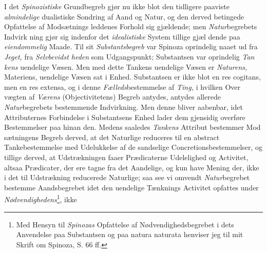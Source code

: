 I det \emph{Spinozistiske} Grundbegreb gjør nu ikke blot den
tidligere paaviste \emph{almindelige} dualistiske Sondring af Aand
og Natur, og den derved betingede Opfattelse af Modsætnings\-%
leddenes Forhold sig gjældende; men \emph{Natur}begrebets Indvirk\-%
ning gjør sig indenfor det \emph{idealistiske} System tillige gjæl\-%
dende paa \emph{eiendommelig} Maade. Til sit \emph{Substantsbegreb}
var Spinoza oprindelig naaet ud fra \emph{Jeget,} fra \emph{Selvbevidst\-%
heden} som Udgangspunkt; Substantsen var oprindelig \emph{Tan\-%
kens} uendelige Væsen. Men med dette Tankens uendelige
Væsen er \emph{Naturens,} Materiens, uendelige Væsen sat i Enhed.
Substantsen er ikke blot en res cogitans, men en res extensa,
og i denne \emph{Fælleds}bestemmelse af \emph{Ting,} i hvilken Over\-%
\setcounter{footnote}{0}%
vægten af \emph{Værens} (Objectivitetens) Begreb antydes, antydes
allerede \emph{Natur}begrebets bestemmende Indvirkning. Men denne
bliver aabenbar, idet Attributernes Forbindelse i Substantsens
Enhed lader dem gjensidig overføre Bestemmelser paa hinan\-%
den. Medens saaledes \emph{Tankens} Attribut bestemmer Mod\-%
sætningens Begreb derved, at det Naturlige reduceres til en
abstract Tankebestemmelse med Udelukkelse af de sandselige
Concretionsbestemmelser, og tillige derved, at Udstrækningen
faaer Prædicaterne Udelelighed og Activitet, altsaa Prædicater,
der ere tagne fra det Aandelige, og kun have Mening der, ikke i
det til Udstrækning reducerede Naturlige; saa see vi omvendt
\emph{Natur}begrebet bestemme Aandsbegrebet idet den uendelige
Tænknings Activitet opfattes under \emph{Nødvendighedens}\footnote{Med Hensyn til \emph{Spinozas} Opfattelse af Nødvendighedsbegrebet i
dets Anvendelse paa Substantsen og paa natura naturata henviser
jeg til mit Skrift om Spinoza, S. 66 ff.}, ikke
